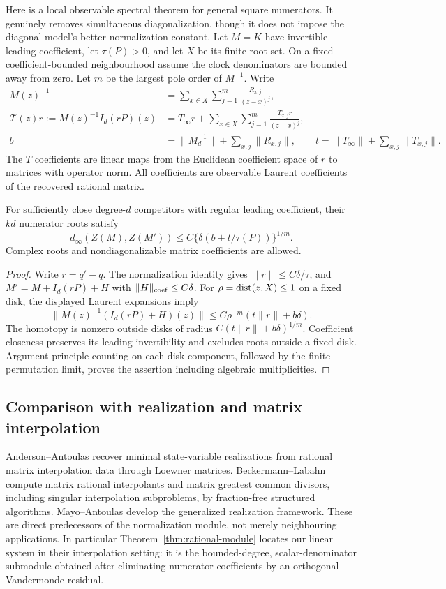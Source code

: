 Here is a local observable spectral theorem for general square
numerators. It genuinely removes simultaneous diagonalization, though
it does not impose the diagonal model's better normalization constant.
Let $M=K$ have invertible leading coefficient, let $\tau(P)>0$, and let
$X$ be its finite root set. On a fixed coefficient-bounded neighbourhood
assume the clock denominators are bounded away from zero. Let $m$ be
the largest pole order of $M^{-1}$. Write
\begin{align*}
 M(z)^{-1}&=\sum_{x\in X}\sum_{j=1}^m\frac{R_{x,j}}{(z-x)^j},\\
 \mathcal T(z)r:=M(z)^{-1}I_d(rP)(z)
   &=T_\infty r+\sum_{x\in X}\sum_{j=1}^m\frac{T_{x,j}r}{(z-x)^j},\\
 b&=\|M_d^{-1}\|+\sum_{x,j}\|R_{x,j}\|,\qquad
 t=\|T_\infty\|+\sum_{x,j}\|T_{x,j}\|.
\end{align*}
The $T$ coefficients are linear maps from the Euclidean coefficient
space of $r$ to matrices with operator norm. All coefficients are
observable Laurent coefficients of the recovered rational matrix.

\begin{proposition}\label{prop:general-bound}
For sufficiently close degree-$d$ competitors with regular leading
coefficient, their $kd$ numerator roots satisfy
\[
 d_\infty(Z(M),Z(M'))\le C\{\delta(b+t/\tau(P))\}^{1/m}.
\]
Complex roots and nondiagonalizable matrix coefficients are allowed.
\end{proposition}
\begin{proof}
Write $r=q'-q$. The normalization identity gives $\|r\|\le C\delta/\tau$,
and $M'=M+I_d(rP)+H$ with $\|H\|_{\rm coef}\le C\delta$.
For $\rho=\operatorname{dist}(z,X)\le1$ on a fixed disk, the displayed Laurent
expansions imply
\[
 \|M(z)^{-1}(I_d(rP)+H)(z)\|
 \le C\rho^{-m}(t\|r\|+b\delta).
\]
The homotopy is nonzero outside disks of radius
$C(t\|r\|+b\delta)^{1/m}$. Coefficient closeness preserves its leading
invertibility and excludes roots outside a fixed disk. Argument-principle
counting on each disk component, followed by the finite-permutation
limit, proves the assertion including algebraic multiplicities.
\end{proof}

\subsection{Comparison with realization and matrix interpolation}
Anderson--Antoulas \cite{AA90} recover minimal state-variable
realizations from rational matrix interpolation data through Loewner
matrices. Beckermann--Labahn \cite{BL00} compute matrix rational
interpolants and matrix greatest common divisors, including singular
interpolation subproblems, by fraction-free structured algorithms.
Mayo--Antoulas \cite{MA07} develop the generalized realization
framework. These are direct predecessors of the normalization module,
not merely neighbouring applications. In particular
Theorem~\ref{thm:rational-module} locates our linear system in their
interpolation setting: it is the bounded-degree, scalar-denominator
submodule obtained after eliminating numerator coefficients by an
orthogonal Vandermonde residual.

